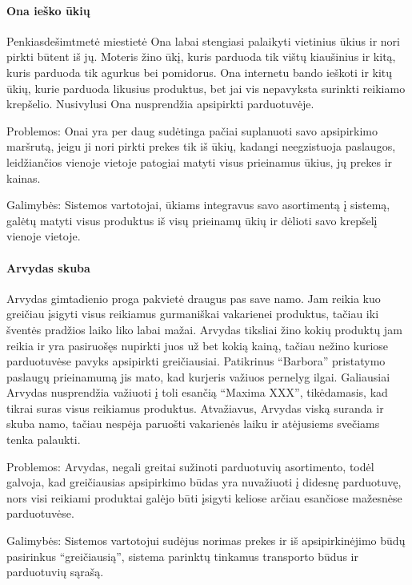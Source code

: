 \documentclass{article}
\begin{document}
\paragraph{Ona ieško ūkių}
	Penkiasdešimtmetė miestietė Ona labai stengiasi palaikyti vietinius ūkius ir nori pirkti būtent iš jų. Moteris žino ūkį, kuris parduoda tik vištų kiaušinius ir kitą, kuris parduoda tik agurkus bei pomidorus. Ona internetu bando ieškoti ir kitų ūkių, kurie parduoda likusius produktus, bet jai vis nepavyksta surinkti reikiamo krepšelio. Nusivylusi Ona nusprendžia apsipirkti parduotuvėje.\par
Problemos: Onai yra per daug sudėtinga pačiai suplanuoti savo apsipirkimo maršrutą, jeigu ji nori pirkti prekes tik iš ūkių, kadangi neegzistuoja paslaugos, leidžiančios vienoje vietoje patogiai matyti visus prieinamus ūkius, jų prekes ir kainas.\par
Galimybės: Sistemos vartotojai, ūkiams integravus savo asortimentą į sistemą, galėtų matyti visus produktus iš visų prieinamų ūkių ir dėlioti savo krepšelį vienoje vietoje.
\paragraph{Arvydas skuba}
	Arvydas gimtadienio proga pakvietė draugus pas save namo. Jam reikia kuo greičiau įsigyti visus reikiamus gurmaniškai vakarienei produktus, tačiau iki šventės pradžios laiko liko labai mažai. Arvydas tiksliai žino kokių produktų jam reikia ir yra pasiruošęs nupirkti juos už bet kokią kainą, tačiau nežino kuriose parduotuvėse pavyks apsipirkti greičiausiai. Patikrinus “Barbora” pristatymo paslaugų prieinamumą jis mato, kad kurjeris važiuos pernelyg ilgai. Galiausiai Arvydas nusprendžia važiuoti į toli esančią “Maxima XXX”, tikėdamasis, kad tikrai suras visus reikiamus produktus. Atvažiavus, Arvydas viską suranda ir skuba namo, tačiau nespėja paruošti vakarienės laiku ir atėjusiems svečiams tenka palaukti.\par
Problemos: Arvydas, negali greitai sužinoti parduotuvių asortimento, todėl galvoja, kad greičiausias apsipirkimo būdas yra nuvažiuoti į didesnę parduotuvę, nors visi reikiami produktai galėjo būti įsigyti keliose arčiau esančiose mažesnėse parduotuvėse.\par
Galimybės: Sistemos vartotojui sudėjus norimas prekes ir iš apsipirkinėjimo būdų pasirinkus “greičiausią”, sistema parinktų tinkamus transporto būdus ir parduotuvių sąrašą.
	\pagebreak

\end{document}

